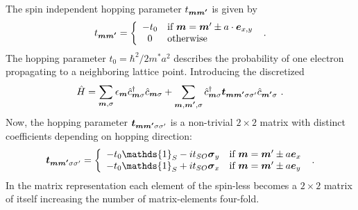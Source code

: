 The spin independent hopping parameter $t_{\boldsymbol{m}\boldsymbol{m'}}$ is given by
\begin{align}
t_{\boldsymbol{m}\boldsymbol{m'}} = \left\{ \begin{array}[c]{cl} -t_0 & \text{if } \boldsymbol{m} = \boldsymbol{m}' \pm a \cdot \boldsymbol{e}_{x,y} \\ 0 & \text{otherwise} \end{array} \right.\ .
	\label{eqn:t0hopping}
\end{align}
The hopping parameter $t_0 = \hbar^2/2m^*a^2$ describes the probability of one electron propagating to a neighboring lattice point. Introducing the discretized \rash{} \hamil{}
\begin{align}
	\hat{H} = \sum_{\boldsymbol{m},\sigma} \epsilon_{\boldsymbol{m}} \hat{c}^{\dagger}_{\boldsymbol{m}\sigma} \hat{c}_{\boldsymbol{m}\sigma} +
	\sum_{\boldsymbol{m},\boldsymbol{m'},\sigma}  \hat{c}^{\dagger}_{\boldsymbol{m}\sigma} \boldsymbol{t}_{\boldsymbol{m}\boldsymbol{m'}\sigma\sigma '} \hat{c}_{\boldsymbol{m'}\sigma}\ .
	\label{eqn:discretizedrashbahamil}
\end{align}
Now, the hopping parameter $\boldsymbol{t}_{\boldsymbol{m}\boldsymbol{m'}\sigma\sigma '}$ is a non-trivial $2 \times 2$ matrix with distinct coefficients depending on hopping direction:
\begin{align}
	\mat{t}_{\v{m}\v{m'}\sigma\sigma '} = \left\{ \begin{array}[c]{cl} -t_0\mathds{1}_S - i t_{SO} \mat{\sigma}_y & \text{if } \v{m} = \v{m}' \pm a \v{e}_{x} \\
		-t_0\mathds{1}_S + i t_{SO} \mat{\sigma}_x & \text{if } \v{m} = \v{m}' \pm a \v{e}_{y} \end{array} \right.\ .
	\label{eqn:tsohopping}
\end{align}
In the matrix representation each element of the spin-less \hamil{} becomes a $2 \times 2$ matrix of itself increasing the number of matrix-elements four-fold.
